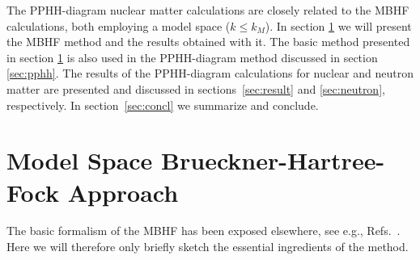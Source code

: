 The PPHH-diagram nuclear matter calculations are closely related to 
the MBHF calculations, both employing a model space ($k\leq k_M$).
In section \ref{sec:mbhf} we will present the MBHF method  and
the results obtained with it.
The basic method  presented in section \ref{sec:mbhf} is also used in 
the PPHH-diagram method discussed in section \ref{sec:pphh}.
The results of the PPHH-diagram calculations for nuclear and 
neutron matter are 
presented and discussed in sections\ \ref{sec:result} and 
\ref{sec:neutron},
respectively.
In section\ \ref{sec:concl} we summarize and conclude.
 
\section{Model Space Brueckner-Hartree-Fock Approach}
\label{sec:mbhf}
The basic formalism of the MBHF has been exposed elsewhere, see e.g.,
Refs.\ \cite{km83,shk87}. Here we will therefore 
only briefly sketch the essential 
ingredients of the method.


